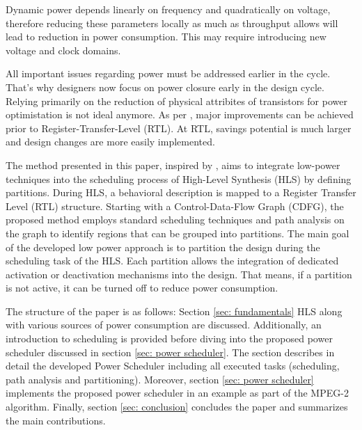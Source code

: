 \documentclass[conference]{IEEEtran}
\begin{document}
Dynamic power depends linearly on frequency and quadratically on voltage, therefore reducing these parameters locally as much as throughput allows will lead to reduction in power consumption. This may require introducing new voltage and clock domains. 

All important issues regarding power must be addressed earlier in the cycle. That's why designers now focus on power closure early in the design cycle. Relying primarily on the reduction of physical attribites of transistors  for power optimistation is not ideal anymore. As per \cite{Ret}, major improvements can be achieved prior to Register-Transfer-Level (RTL). At RTL, savings potential is much larger and design changes are more easily implemented. 


The method presented in this paper, inspired by \cite{Ret}, aims to integrate low-power techniques into the scheduling process of High-Level Synthesis (HLS) by defining partitions. During HLS, a behavioral description is mapped to a Register Transfer Level (RTL) structure. Starting with a Control-Data-Flow Graph (CDFG), the proposed method employs standard scheduling techniques and path analysis on the graph to identify regions that can be grouped into partitions. The main goal of the developed low power approach is to partition the design during the scheduling task of the HLS. Each partition allows the integration of dedicated activation or deactivation mechanisms into the design. That means, if a partition is not active, it can be turned off to reduce power consumption.


The structure of the paper is as follows: Section \ref{sec: fundamentals} HLS along with various sources of power consumption are discussed. Additionally, an introduction to scheduling is provided before diving into the proposed power scheduler discussed in section \ref{sec: power scheduler}. The section describes in detail the developed Power Scheduler including all executed tasks (scheduling, path analysis and partitioning). Moreover, section \ref{sec: power scheduler} implements the proposed power scheduler in an example as part of the MPEG-2 algorithm. Finally, section \ref{sec: conclusion} concludes the paper and summarizes the main contributions. 
\end{document}
